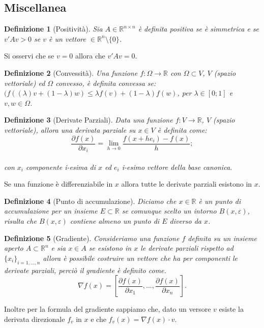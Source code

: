 \documentclass[a4paper, 12pt]{article}
\newtheorem{definition}{Definizione}
\begin{document}
\subsection{Miscellanea}
\begin{definition}[Positività]
Sia $A \in \mathbb{R}^{n \times n}$ è definita positiva se è simmetrica e se $v'Av > 0$ se $v$ è un vettore $\in \mathbb{R}^n \setminus \{0\}$.
\end{definition}
Si osservi che se $v = 0$ allora che $v'Av = 0$.
\begin{definition}[Convessità]
Una funzione $f:\Omega \to \mathbb{R}$ con $\Omega \subset V$, $V$ (spazio vettoriale) ed $\Omega$ convesso, è definita convessa se: $(f((\lambda)v + (1 - \lambda)w) \leq \lambda f(v) + (1 - \lambda)f(w)$, per $\lambda \in [0;1]$ e $v, w \in \Omega$.
\end{definition}
\begin{definition}[Derivate Parziali]
Data una funzione $f:V \to \mathbb{R}$, $V$ (spazio vettoriale), allora una derivata parziale su $x \in V$ è definita come:\\
\[\frac{\partial f(x)}{\partial x_i} = \lim_{h \to 0} \frac{f(x + h e_i) - f(x)}{h};\]\\ 
con $x_i$ componente i-esima di $x$ ed $e_i$ i-esimo vettore della base canonica.\\
\end{definition}
Se una funzione è differenziabile in $x$ allora tutte le derivate parziali esistono in $x$.
\begin{definition}[Punto di accumulazione]
Diciamo che $x \in \mathbb{R}$ è un punto di accumulazione per un insieme $E \subset \mathbb{R}$ se comunque scelto un intorno $B(x, \varepsilon)$, risulta che $B(x, \varepsilon)$ contiene almeno un punto di $E$ diverso da $x$.
\end{definition}
\begin{definition}[Gradiente]
Consideriamo una funzione $f$ definita su un insieme aperto $A \subset \mathbb{R}^n$ e sia $x \in A$ se esistono in $x$ le derivate parziali rispetto ad $\{x_i\}_{i=1, ..., n}$ allora è possibile costruire un vettore che ha per componenti le derivate parziali, perciò il gradiente è definito come.\\
\[\nabla f(x) = \left[\frac{\partial f(x)}{\partial x_1}, ..., \frac{\partial f(x)}{\partial x_n}\right].\]
\end{definition}
Inoltre per la formula del gradiente sappiamo che, dato un versore $v$ esiste la derivata direzionale $f_v$ in $x$ e che $f_v(x) = \nabla f(x) \cdot v$.
\newpage



\end{document}
